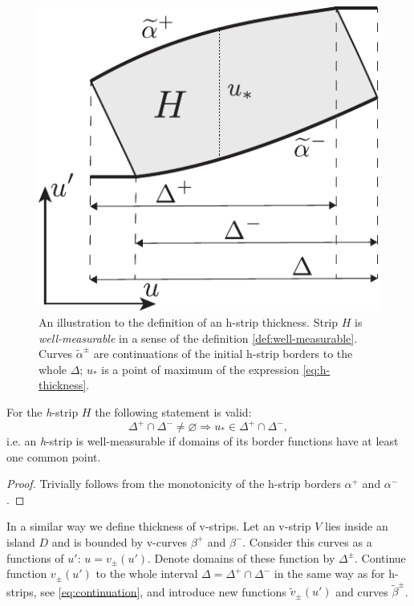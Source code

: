 \begin{figure}[h]
\centering
	\includegraphics[scale = 1]{pic/thickness definition}
	\caption{An illustration to the definition of an h-strip thickness. Strip $H$ is {\it well-measurable} in a sense of the definition \ref{def:well-measurable}. Curves $\widetilde{\alpha}^{\pm}$ are continuations of the initial h-strip borders to the whole $\Delta$; $u_*$ is a point of maximum of the expression \eqref{eq:h-thickness}.}
\label{fig:thickness-definition}
\end{figure}

\begin{proposition}
	For the \emph{h}-strip $H$ the following statement is valid:
	\begin{equation}
		\Delta^+ \cap \Delta^- \neq \varnothing \Rightarrow u_* \in \Delta^+ \cap \Delta^-,
	\end{equation}
	i.e. an \emph{h}-strip is well-measurable if domains of its border functions have at least one common point.
\end{proposition}
\begin{proof}
	Trivially follows from the monotonicity of the h-strip borders $\alpha^+$ and $\alpha^-$.
\end{proof}

In a similar way we define thickness of v-strips.
Let an v-strip $V$ lies inside an island $D$ and is bounded by v-curves $\beta^+$ and $\beta^-$.
Consider this curves as a functions of $u'$: $u = v_{\pm}(u')$.
Denote domains of these function by $\Delta^{\pm}$.
Continue function $v_{\pm}(u')$ to the whole interval $\Delta = \Delta^+ \cap \Delta^-$ in the same way as for h-strips, see \eqref{eq:continuation}, and introduce new functions $\widetilde{v}_{\pm}(u')$ and curves $\widetilde{\beta}^{\pm}$.

